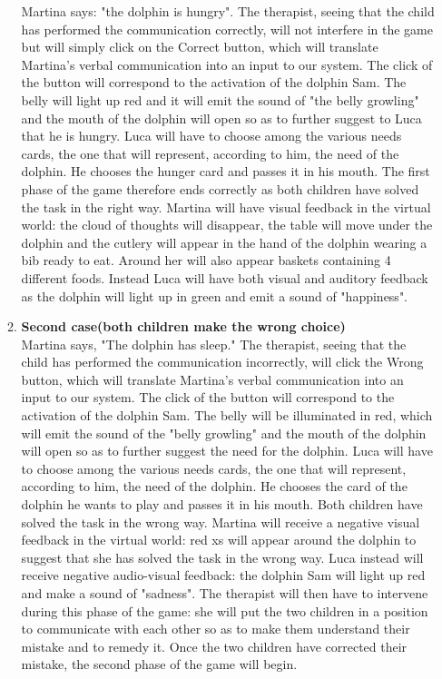 \documentclass [12pt]{article}
\begin{document}
\begin{enumerate}
\begin{enumerate}
Martina says: "the dolphin is hungry". The therapist, seeing that the child has performed the communication correctly, will not interfere in the game but will simply click on the Correct button, which will translate Martina's verbal communication into an input to our system. The click of the button will correspond to the activation of the dolphin Sam. The belly will light up red and it will emit the sound of "the belly growling" and the mouth of the dolphin will open so as to further suggest to Luca that he is hungry. Luca will have to choose among the various needs cards, the one that will represent, according to him, the need of the dolphin. He chooses the hunger card and passes it in his mouth. The first phase of the game therefore ends correctly as both children have solved the task in the right way. Martina will have visual feedback in the virtual world: the cloud of thoughts will disappear, the table will move under the dolphin and the cutlery will appear in the hand of the dolphin wearing a bib ready to eat. Around her will also appear baskets containing 4 different foods. 
Instead Luca will have both visual and auditory feedback as the dolphin will light up in green and emit a sound of "happiness".
\item \textbf{Second case(both children make the wrong choice)}\\
Martina says, "The dolphin has sleep." The therapist, seeing that the child has performed the communication incorrectly, will click the Wrong button, which will translate Martina's verbal communication into an input to our system. The click of the button will correspond to the activation of the dolphin Sam. The belly will be illuminated in red, which will emit the sound of the "belly growling" and the mouth of the dolphin will open so as to further suggest the need for the dolphin. Luca will have to choose among the various needs cards, the one that will represent, according to him, the need of the dolphin.  He chooses the card of the dolphin he wants to play and passes it in his mouth. Both children have solved the task in the wrong way. Martina will receive a negative visual feedback in the virtual world: red xs will appear around the dolphin to suggest that she has solved the task in the wrong way. Luca instead will receive negative audio-visual feedback: the dolphin Sam will light up red and make a sound of "sadness".  The therapist will then have to intervene during this phase of the game: she will put the two children in a position to communicate with each other so as to make them understand their mistake and to remedy it. Once the two children have corrected their mistake, the second phase of the game will begin.

\end{enumerate}
\end{enumerate}
\end{document}
